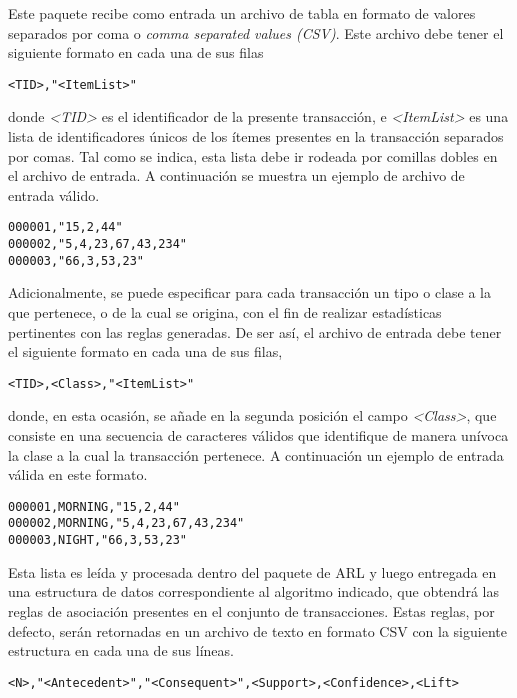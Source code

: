 Este paquete recibe como entrada un archivo de tabla en formato de valores separados por coma o \textit{comma separated values (CSV)}. Este archivo debe tener el siguiente formato en cada una de sus filas

\begin{lstlisting}[basicstyle=\ttfamily]
<TID>,"<ItemList>"
\end{lstlisting}

donde \textit{<TID>} es el identificador de la presente transacción, e \textit{<ItemList>} es una lista de identificadores únicos de los ítemes presentes en la transacción separados por comas. Tal como se indica, esta lista debe ir rodeada por comillas dobles en el archivo de entrada. A continuación se muestra un ejemplo de archivo de entrada válido.

\begin{lstlisting}[basicstyle=\ttfamily]
000001,"15,2,44"
000002,"5,4,23,67,43,234"
000003,"66,3,53,23"
\end{lstlisting}

Adicionalmente, se puede especificar para cada transacción un tipo o clase a la que pertenece, o de la cual se origina, con el fin de realizar estadísticas pertinentes con las reglas generadas. De ser así, el archivo de entrada debe tener el siguiente formato en cada una de sus filas,

\begin{lstlisting}[basicstyle=\ttfamily]
<TID>,<Class>,"<ItemList>"
\end{lstlisting}

donde, en esta ocasión, se añade en la segunda posición el campo \textit{<Class>}, que consiste en una secuencia de caracteres válidos que identifique de manera unívoca la clase a la cual la transacción pertenece. A continuación un ejemplo de entrada válida en este formato.

\begin{lstlisting}[basicstyle=\ttfamily]
000001,MORNING,"15,2,44"
000002,MORNING,"5,4,23,67,43,234"
000003,NIGHT,"66,3,53,23"
\end{lstlisting}

Esta lista es leída y procesada dentro del paquete de ARL y luego entregada en una estructura de datos correspondiente al algoritmo indicado, que obtendrá las reglas de asociación presentes en el conjunto de transacciones. Estas reglas, por defecto, serán retornadas en un archivo de texto en formato CSV con la siguiente estructura en cada una de sus líneas.

\begin{lstlisting}[basicstyle=\ttfamily]
<N>,"<Antecedent>","<Consequent>",<Support>,<Confidence>,<Lift>
\end{lstlisting}

